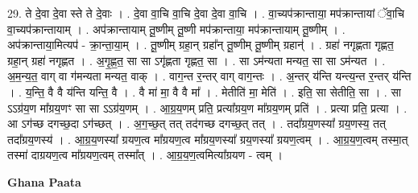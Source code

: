 \documentclass[17pt]{extarticle}
\begin{document}
29. ते दे॒वा दे॒वा स्ते ते दे॒वाः । . दे॒वा वा॒चि वा॒चि दे॒वा दे॒वा वा॒चि । . वा॒च्यप॑क्रान्ताया॒ मप॑क्रान्तायां ॅवा॒चि वा॒च्यप॑क्रान्तायाम् । . अप॑क्रान्तायाम् तू॒ष्णीम् तू॒ष्णी मप॑क्रान्ताया॒ मप॑क्रान्तायाम् तू॒ष्णीम् । . अप॑क्रान्ताया॒मित्यप॑ - क्रा॒न्ता॒या॒म् । . तू॒ष्णीम् ग्रहा॒न् ग्रहा᳚न् तू॒ष्णीम् तू॒ष्णीम् ग्रहान्॑ । . ग्रहा॑ नगृह्णता गृह्णत॒ ग्रहा॒न् ग्रहा॑ नगृह्णत । . अ॒गृ॒ह्ण॒त॒ सा सा ऽगृ॑ह्णता गृह्णत॒ सा । . सा ऽम॑न्यता मन्यत॒ सा सा ऽम॑न्यत । . अ॒म॒न्य॒त॒ वाग् वा ग॑मन्यता मन्यत॒ वाक् । . वाग॒न्त र॒न्तर् वाग् वाग॒न्तः । . अ॒न्तर् य॑न्ति यन्त्य॒न्त र॒न्तर् य॑न्ति । . य॒न्ति॒ वै वै य॑न्ति यन्ति॒ वै । . वै मा॑ मा॒ वै वै मा᳚ । . मेतीति॑ मा॒ मेति॑ । . इति॒ सा सेतीति॒ सा । . सा ऽऽग्र॑य॒ण मा᳚ग्रय॒णꣳ सा सा ऽऽग्र॑य॒णम् । . आ॒ग्र॒य॒णम् प्रति॒ प्रत्या᳚ग्रय॒ण मा᳚ग्रय॒णम् प्रति॑ । . प्रत्या प्रति॒ प्रत्या । . आ ऽग॑च्छ दगच्छ॒दा ऽग॑च्छत् । . अ॒ग॒च्छ॒त् तत् तद॑गच्छ दगच्छ॒त् तत् । . तदा᳚ग्रय॒णस्या᳚ ग्रय॒णस्य॒ तत् तदा᳚ग्रय॒णस्य॑ । . आ॒ग्र॒य॒णस्या᳚ ग्रयण॒त्व मा᳚ग्रयण॒त्व मा᳚ग्रय॒णस्या᳚ ग्रय॒णस्या᳚ ग्रयण॒त्वम् । . आ॒ग्र॒य॒ण॒त्वम् तस्मा॒त् तस्मा॑ दाग्रयण॒त्व मा᳚ग्रयण॒त्वम् तस्मा᳚त् । . आ॒ग्र॒य॒ण॒त्वमित्या᳚ग्रयण - त्वम् । \newline

\textbf{Ghana Paata } \newline
\end{document}

